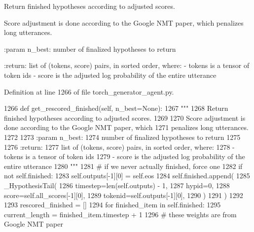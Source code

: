 \begin{DoxyVerb}Return finished hypotheses according to adjusted scores.

Score adjustment is done according to the Google NMT paper, which
penalizes long utterances.

:param n_best:
    number of finalized hypotheses to return

:return:
    list of (tokens, score) pairs, in sorted order, where:
      - tokens is a tensor of token ids
      - score is the adjusted log probability of the entire utterance
\end{DoxyVerb}
 

Definition at line 1266 of file torch\+\_\+generator\+\_\+agent.\+py.


\begin{DoxyCode}
1266     \textcolor{keyword}{def }get\_rescored\_finished(self, n\_best=None):
1267         \textcolor{stringliteral}{"""}
1268 \textcolor{stringliteral}{        Return finished hypotheses according to adjusted scores.}
1269 \textcolor{stringliteral}{}
1270 \textcolor{stringliteral}{        Score adjustment is done according to the Google NMT paper, which}
1271 \textcolor{stringliteral}{        penalizes long utterances.}
1272 \textcolor{stringliteral}{}
1273 \textcolor{stringliteral}{        :param n\_best:}
1274 \textcolor{stringliteral}{            number of finalized hypotheses to return}
1275 \textcolor{stringliteral}{}
1276 \textcolor{stringliteral}{        :return:}
1277 \textcolor{stringliteral}{            list of (tokens, score) pairs, in sorted order, where:}
1278 \textcolor{stringliteral}{              - tokens is a tensor of token ids}
1279 \textcolor{stringliteral}{              - score is the adjusted log probability of the entire utterance}
1280 \textcolor{stringliteral}{        """}
1281         \textcolor{comment}{# if we never actually finished, force one}
1282         \textcolor{keywordflow}{if} \textcolor{keywordflow}{not} self.finished:
1283             self.outputs[-1][0] = self.eos
1284             self.finished.append(
1285                 \_HypothesisTail(
1286                     timestep=len(self.outputs) - 1,
1287                     hypid=0,
1288                     score=self.all\_scores[-1][0],
1289                     tokenid=self.outputs[-1][0],
1290                 )
1291             )
1292 
1293         rescored\_finished = []
1294         \textcolor{keywordflow}{for} finished\_item \textcolor{keywordflow}{in} self.finished:
1295             current\_length = finished\_item.timestep + 1
1296             \textcolor{comment}{# these weights are from Google NMT paper}

\end{DoxyCode}
